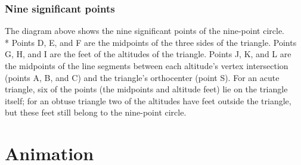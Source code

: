 \documentclass{beamer}
\begin{document}



	\begin{frame}
	
	    \frametitle{Nine significant points}
	 
	        The diagram above shows the nine significant points of the nine-point circle.\\*
		\medskip
	Points D, E, and F are the midpoints of the three sides of the triangle. Points G, H, and I are the feet of the altitudes of the triangle. Points J, K, and L are the midpoints of the line segments between each altitude's vertex intersection (points A, B, and C) and the triangle's orthocenter (point S).
	For an acute triangle, six of the points (the midpoints and altitude feet) lie on the triangle itself; for an obtuse triangle two of the altitudes have feet outside the triangle, but these feet still belong to the nine-point circle.
	\end{frame}
	
	
\section{Animation}
	
\end{document}
